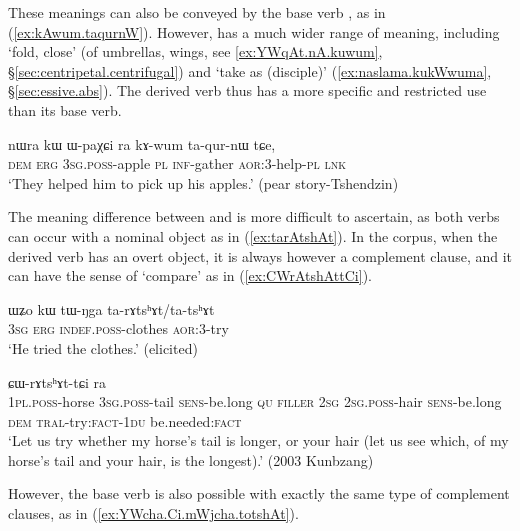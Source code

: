 These meanings can also be conveyed by the base verb , as in (\ref{ex:kAwum.taqurnW}). However,  has a much wider range of meaning, including `fold, close' (of umbrellas, wings, see \ref{ex:YWqAt.nA.kuwum}, §\ref{sec:centripetal.centrifugal}) and `take as (disciple)' (\ref{ex:naslama.kukWwuma}, §\ref{sec:essive.abs}). The derived verb  thus has a more specific and restricted use than its base verb.

\begin{exe}
\ex \label{ex:kAwum.taqurnW}
\gll nɯra kɯ ɯ-paχɕi ra kɤ-wum ta-qur-nɯ tɕe, \\
\textsc{dem} \textsc{erg} \textsc{3sg}.\textsc{poss}-apple \textsc{pl} \textsc{inf}-gather \textsc{aor}:3\flobv{}-help-\textsc{pl} \textsc{lnk} \\
\glt `They helped him to pick up his apples.' (pear story-Tshendzin)
\end{exe}

The meaning difference between  and  is more difficult to ascertain, as both verbs can occur with a nominal object as in (\ref{ex:tarAtshAt}). In the corpus, when the derived verb  has an overt object, it is always however a complement clause, and it can have the sense of `compare' as in (\ref{ex:CWrAtshAttCi}).

\begin{exe}
\ex \label{ex:tarAtshAt}
\gll ɯʑo kɯ tɯ-ŋga ta-rɤtsʰɤt/ta-tsʰɤt \\
\textsc{3sg} \textsc{erg} \textsc{indef}.\textsc{poss}-clothes \textsc{aor}:3\flobv{}-try \\
\glt `He tried the clothes.' (elicited)
\end{exe}

\begin{exe}
\ex \label{ex:CWrAtshAttCi}
 ɕɯ-rɤtsʰɤt-tɕi ra \\
\textsc{1pl}.\textsc{poss}-horse \textsc{3sg}.\textsc{poss}-tail \textsc{sens}-be.long \textsc{qu} \textsc{filler} \textsc{2sg} \textsc{2sg}.\textsc{poss}-hair \textsc{sens}-be.long \textsc{dem} \textsc{tral}-try:\textsc{fact}-\textsc{1du} be.needed:\textsc{fact} \\
\glt `Let us try whether my horse's tail is longer, or your hair (let us see which, of my horse's tail and your hair, is the longest).' (2003 Kunbzang)
\end{exe}

However, the base verb is also possible with exactly the same type of complement clauses, as in (\ref{ex:YWcha.Ci.mWjcha.totshAt}).

